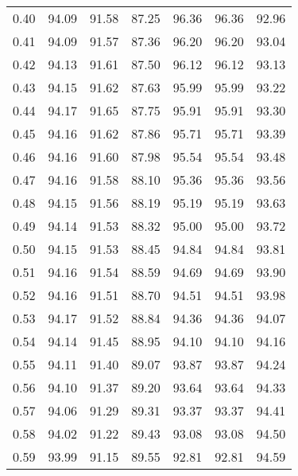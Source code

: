 \begin{tabular}{|c|c|c|c|c|c|c|}
      0.40 &     94.09 &     91.58 &      87.25 &   96.36 &      96.36 &         92.96 \\
      0.41 &     94.09 &     91.57 &      87.36 &   96.20 &      96.20 &         93.04 \\
      0.42 &     94.13 &     91.61 &      87.50 &   96.12 &      96.12 &         93.13 \\
      0.43 &     94.15 &     91.62 &      87.63 &   95.99 &      95.99 &         93.22 \\
      0.44 &     94.17 &     91.65 &      87.75 &   95.91 &      95.91 &         93.30 \\
      0.45 &     94.16 &     91.62 &      87.86 &   95.71 &      95.71 &         93.39 \\
      0.46 &     94.16 &     91.60 &      87.98 &   95.54 &      95.54 &         93.48 \\
      0.47 &     94.16 &     91.58 &      88.10 &   95.36 &      95.36 &         93.56 \\
      0.48 &     94.15 &     91.56 &      88.19 &   95.19 &      95.19 &         93.63 \\
      0.49 &     94.14 &     91.53 &      88.32 &   95.00 &      95.00 &         93.72 \\
      0.50 &     94.15 &     91.53 &      88.45 &   94.84 &      94.84 &         93.81 \\
      0.51 &     94.16 &     91.54 &      88.59 &   94.69 &      94.69 &         93.90 \\
      0.52 &     94.16 &     91.51 &      88.70 &   94.51 &      94.51 &         93.98 \\
      0.53 &     94.17 &     91.52 &      88.84 &   94.36 &      94.36 &         94.07 \\
      0.54 &     94.14 &     91.45 &      88.95 &   94.10 &      94.10 &         94.16 \\
      0.55 &     94.11 &     91.40 &      89.07 &   93.87 &      93.87 &         94.24 \\
      0.56 &     94.10 &     91.37 &      89.20 &   93.64 &      93.64 &         94.33 \\
      0.57 &     94.06 &     91.29 &      89.31 &   93.37 &      93.37 &         94.41 \\
      0.58 &     94.02 &     91.22 &      89.43 &   93.08 &      93.08 &         94.50 \\
      0.59 &     93.99 &     91.15 &      89.55 &   92.81 &      92.81 &         94.59 \\

\end{tabular}
